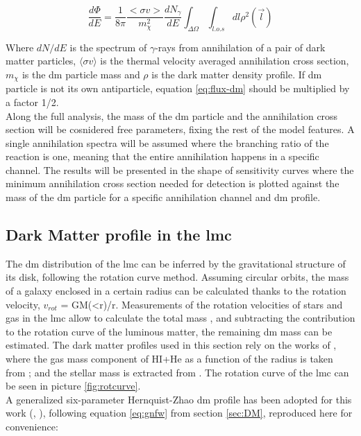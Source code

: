 \documentclass[main.tex]{subfiles}
\begin{document}
\begin{equation}
    \frac{d \Phi}{dE}=\frac{1}{8 \pi} \frac{<\sigma v>}{m_{\chi}^2} \frac{d N_{\gamma}}{dE} \int_{\Delta\Omega}\int_{l.o.s} dl \rho^2(\vec{l})
\label{eq:flux-dm}
\end{equation}

Where $dN/dE$ is the spectrum of $\gamma$-rays from annihilation of a pair of dark matter particles, $\langle\sigma v\rangle$ is the thermal velocity averaged annihilation cross section, $m_\chi$ is the \gls{dm} particle mass and $\rho$ is the dark matter density profile. If \gls{dm} particle is not its own antiparticle, equation \ref{eq:flux-dm} should be multiplied by a factor 1/2. \\
Along the full analysis, the mass of the \gls{dm} particle and the annihilation cross section will be cosnidered free parameters, fixing the rest of the model features. A single annihilation spectra will be assumed where the branching ratio of the reaction is one, meaning that the entire annihilation happens in a specific channel. The results will be presented in the shape of sensitivity curves where the minimum annihilation cross section needed for detection is plotted against the mass of the \gls{dm} particle for a specific annihilation channel and \gls{dm} profile.

\subsection{Dark Matter profile in the \gls{lmc}}

The \gls{dm} distribution of the \gls{lmc} can be inferred by the gravitational structure of its disk, following the rotation curve method. Assuming circular orbits, the mass of a galaxy enclosed in a certain radius can be calculated thanks to the rotation velocity, $v_{rot}$ = GM(<r)/r. Measurements of the rotation velocities of stars and gas in the \gls{lmc} allow to calculate the total mass \cite{LMCHI}, and subtracting the contribution to the rotation curve of the luminous matter, the remaining \gls{dm} mass can be estimated. The dark matter profiles used in this section rely on the works of \cite{2015FermiLMCDM}, where the gas mass component of HI+He as a function of the radius is taken from \cite{1992gasLMC}; and the stellar mass is extracted from \cite{2006LMCkinematics}. The rotation curve of the \gls{lmc} can be seen in picture \ref{fig:rotcurve}.\\
A generalized six-parameter Hernquist-Zhao \gls{dm} profile has been adopted for this work (\cite{1990Hernquist}, \cite{1996Zhao}), following equation \ref{eq:gnfw} from section \ref{sec:DM}, reproduced here for convenience:
\end{document}
